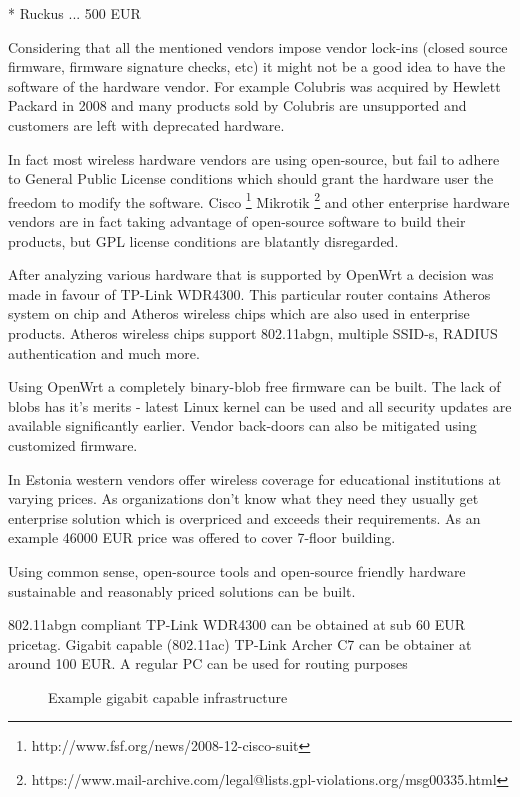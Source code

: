 \documentclass{article}
\begin{document}
{* Ruckus ... 500 EUR


Considering that all the mentioned vendors impose vendor lock-ins
(closed source firmware, firmware signature checks, etc)
it might not be a good idea to have the software of the hardware vendor.
For example Colubris was acquired by Hewlett Packard in 2008 and many products
sold by Colubris are unsupported and customers are left with
deprecated hardware.

In fact most wireless hardware vendors are using open-source, but
fail to adhere to General Public License conditions which should grant
the hardware user the freedom to modify the software.
Cisco \footnote{http://www.fsf.org/news/2008-12-cisco-suit}
Mikrotik \footnote{https://www.mail-archive.com/legal@lists.gpl-violations.org/msg00335.html}
and other enterprise hardware vendors are in fact taking advantage
of open-source software to build their products, but GPL license conditions
are blatantly disregarded.

After analyzing various hardware that is supported by OpenWrt
a decision was made in favour of TP-Link WDR4300.
This particular router
contains Atheros system on chip and Atheros wireless chips
which are also used in enterprise products.
Atheros wireless chips support 802.11abgn, multiple SSID-s,
RADIUS authentication and much more.

Using OpenWrt a completely binary-blob free firmware can be built.
The lack of blobs has it's merits - latest Linux kernel can be used
and all security updates are available significantly earlier.
Vendor back-doors can also be mitigated using customized firmware.


In Estonia western vendors offer wireless coverage for educational institutions
at varying prices.
As organizations don't know what they need they usually get enterprise solution which
is overpriced and exceeds their requirements.
As an example 46000 EUR price was offered to cover 7-floor building.

Using common sense, open-source tools and open-source friendly hardware
sustainable and reasonably priced solutions can be built.

802.11abgn compliant TP-Link WDR4300 can be obtained at sub 60 EUR pricetag.
Gigabit capable (802.11ac) TP-Link Archer C7 can be obtainer at around 100 EUR.
A regular PC can be used for routing purposes


\begin{figure}[!htb]
\centering
\scalebox{0.5}{}
\caption{Example gigabit capable infrastructure}
\label{fig:digraph}
\end{figure}


}
\end{document}
